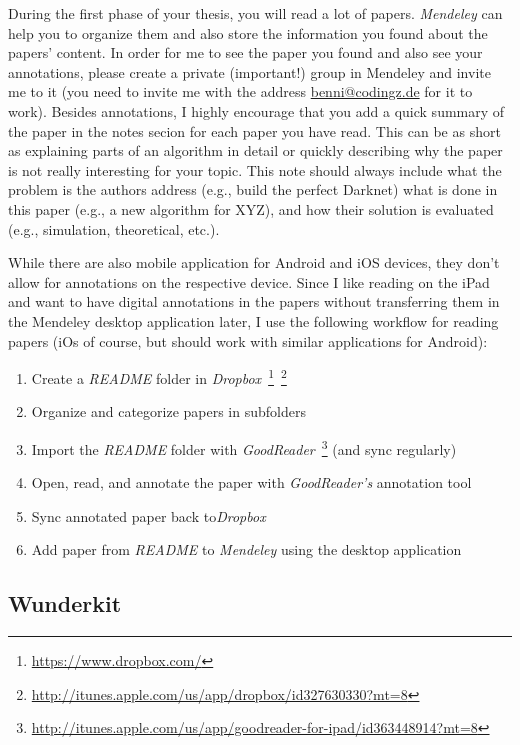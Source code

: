 \documentclass{article}
\begin{document}
During the first phase of your thesis, you will read a lot of papers.
\emph{Mendeley} can help you to organize them and also store the information you found about the papers' content.
In order for me to see the paper you found and also see your annotations, please create a private (important!) group in Mendeley and invite me to it (you need to invite me with the address \url{benni@codingz.de} for it to work).
Besides annotations, I highly encourage that you add a quick summary of the paper in the notes secion for each paper you have read.
This can be as short as explaining parts of an algorithm in detail or quickly describing why the paper is not really interesting for your topic.
This note should always include what the problem is the authors address (e.g., build the perfect Darknet) what is done in this paper (e.g., a new algorithm for XYZ), and how their solution is evaluated (e.g., simulation, theoretical, etc.).

While there are also mobile application for Android and iOS devices, they don't allow for annotations on the respective device.
Since I like reading on the iPad and want to have digital annotations in the papers without transferring them in the Mendeley desktop application later, I use the following workflow for reading papers (iOs of course, but should work with similar applications for Android):

\begin{enumerate}
	\item Create a \emph{README} folder in \emph{Dropbox}~\footnote{\url{https://www.dropbox.com/}}~\footnote{\url{http://itunes.apple.com/us/app/dropbox/id327630330?mt=8}}
	\item Organize and categorize papers in subfolders
	\item Import the \emph{README} folder with \emph{GoodReader}~\footnote{\url{http://itunes.apple.com/us/app/goodreader-for-ipad/id363448914?mt=8}} (and sync regularly)
	\item Open, read, and annotate the paper with \emph{GoodReader's} annotation tool
	\item Sync annotated paper back to\emph{Dropbox}
	\item Add paper from \emph{README} to \emph{Mendeley} using the desktop application
\end{enumerate}




\subsection{Wunderkit}
\end{document}
